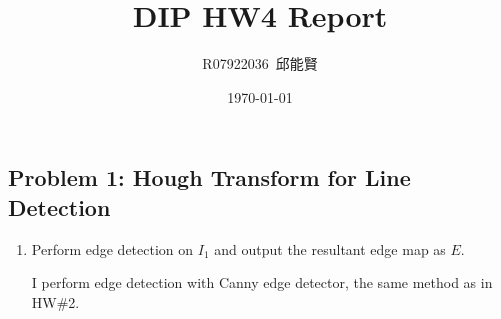 \documentclass[12pt,a4paper,notitlepage,oneside,amsmath,amssymb]{article}
\begin{document}
\begin{CJK*}{UTF8}{bkai}

	\CJKtilde{}
	\CJKindent{}
	\title{\vspace{-10ex}DIP HW4 Report}
	\author{R07922036~邱能賢}
	\date{\vspace{-1ex}\today}

	\maketitle

	\vspace{-5ex}

	\section*{Problem 1: Hough Transform for Line Detection}

	\begin{enumerate}[label=(\alph*)]
		\item Perform edge detection on \(I_1\) and output the resultant edge map as \(E\).

		      I perform edge detection with Canny edge detector, the same method as in HW\#2.


\end{enumerate}
\end{CJK*}
\end{document}
